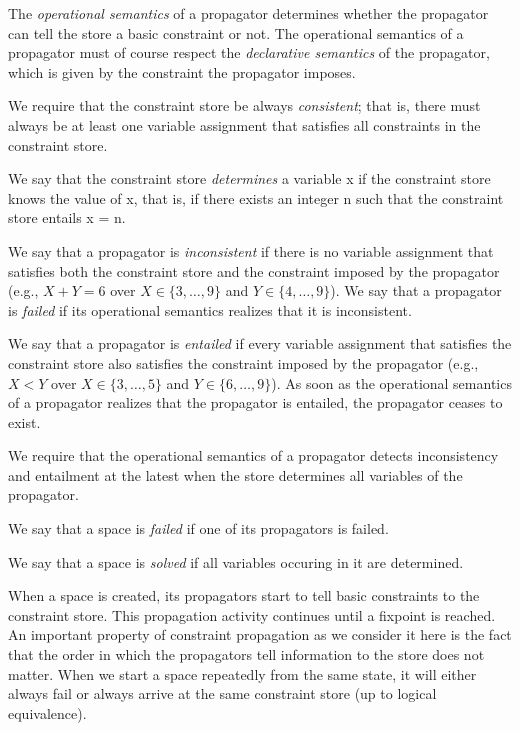 \documentclass[a4paper,halfparskip]{scrartcl}
\newcommand{\dom}[2]{\ensuremath{\{#1,\dots,#2\}}}
\begin{document}
The \emph{operational semantics} of a propagator determines 
whether the propagator can tell the store 
a basic constraint or not. The operational semantics of a 
propagator must of course respect 
the \emph{declarative semantics} of the propagator, which is 
given by the constraint the propagator imposes.

We require that the constraint store be always \emph{consistent}; 
that is, there must always be at least 
one variable assignment that satisfies all constraints in the 
constraint store.

We say that the constraint store \emph{determines} a variable 
x if the constraint store knows the value of x, 
that is, if there exists an integer n such that the constraint 
store entails x = n.

We say that a propagator is \emph{inconsistent} if there is 
no variable assignment that satisfies 
both the constraint store and the constraint imposed by the 
propagator 
(e.g., $ X + Y = 6 $ over $ X \in \dom{3}{9} $ and $ Y \in \dom{4}{9} $). 
We say that a propagator is \emph{failed} if its 
operational semantics realizes that it is inconsistent.

We say that a propagator is \emph{entailed} if every variable 
assignment that satisfies the constraint 
store also satisfies the constraint imposed by the propagator 
(e.g., $ X < Y $ over $ X \in \dom{3}{5} $ and $ Y \in \dom{6}{9} $). 
As soon as the operational semantics of a 
propagator realizes that the propagator is entailed, the 
propagator ceases to exist.

We require that the operational semantics of a propagator 
detects inconsistency and entailment at the 
latest when the store determines all variables of the 
propagator.

We say that a space is \emph{failed} if one of its propagators 
is failed. 

We say that a space is \emph{solved} if all variables occuring 
in it are determined.

When a space is created, its propagators start to tell basic 
constraints to the constraint store. 
This propagation activity continues until a fixpoint is reached. 
An important property of constraint 
propagation as we consider it here is the fact that the order 
in which the propagators tell information 
to the store does not matter. When we start a space repeatedly 
from the same state, it will either 
always fail or always arrive at the same constraint store 
(up to logical equivalence).
\end{document}
